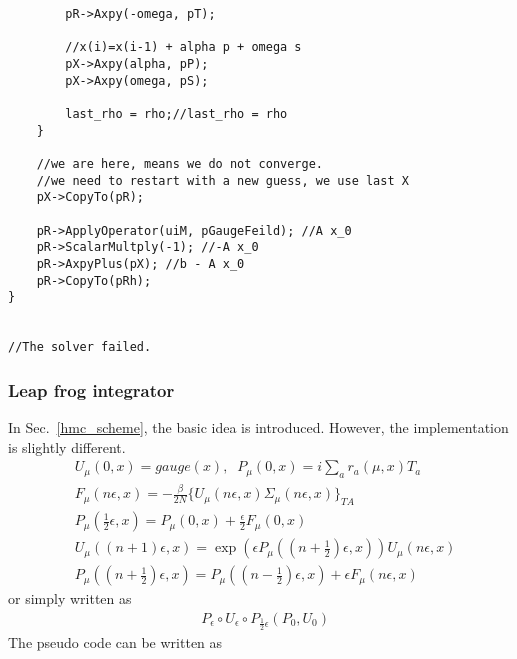 \begin{lstlisting}
        pR->Axpy(-omega, pT);

        //x(i)=x(i-1) + alpha p + omega s
        pX->Axpy(alpha, pP);
        pX->Axpy(omega, pS);

        last_rho = rho;//last_rho = rho
    }

    //we are here, means we do not converge.
    //we need to restart with a new guess, we use last X
    pX->CopyTo(pR);

    pR->ApplyOperator(uiM, pGaugeFeild); //A x_0
    pR->ScalarMultply(-1); //-A x_0
    pR->AxpyPlus(pX); //b - A x_0
    pR->CopyTo(pRh);
}


//The solver failed.

\end{lstlisting}


\subsubsection{\label{Leap frog}Leap frog integrator}

In Sec.~\ref{hmc_scheme}, the basic idea is introduced. However, the implementation is slightly different.
\begin{subequations}
\begin{eqnarray}
&U_{\mu}(0,x)=gauge(x),\;\;P_{\mu}(0,x)=i\sum _{a}r_a(\mu,x)T_a\\
&F_{\mu}(n\epsilon,x)=-\frac{\beta}{2N}\{U_{\mu}(n\epsilon,x)\Sigma _{\mu}(n\epsilon,x)\}_{TA}\\
&P_{\mu}(\frac{1}{2}\epsilon,x)=P_{\mu}(0,x)+\frac{\epsilon}{2}F_{\mu}(0,x)\\
&U_{\mu}((n+1)\epsilon,x)=\exp \left(\epsilon P_{\mu}((n+\frac{1}{2})\epsilon,x)\right)U_{\mu}(n\epsilon,x)\\
&P_{\mu}((n+\frac{1}{2})\epsilon,x)=P_{\mu}((n-\frac{1}{2})\epsilon,x)+\epsilon F_{\mu}(n\epsilon,x)
\end{eqnarray}
\label{eq.hmc.update_leapfrog}
\end{subequations}
or simply written as
\begin{equation}
\begin{split}
&P_{\epsilon}\circ U_{\epsilon}\circ P_{\frac{1}{2}\epsilon}\left(P_0,U_0\right)
\end{split}
\label{eq.hmc.update_leapfrog2}
\end{equation}
The pseudo code can be written as

